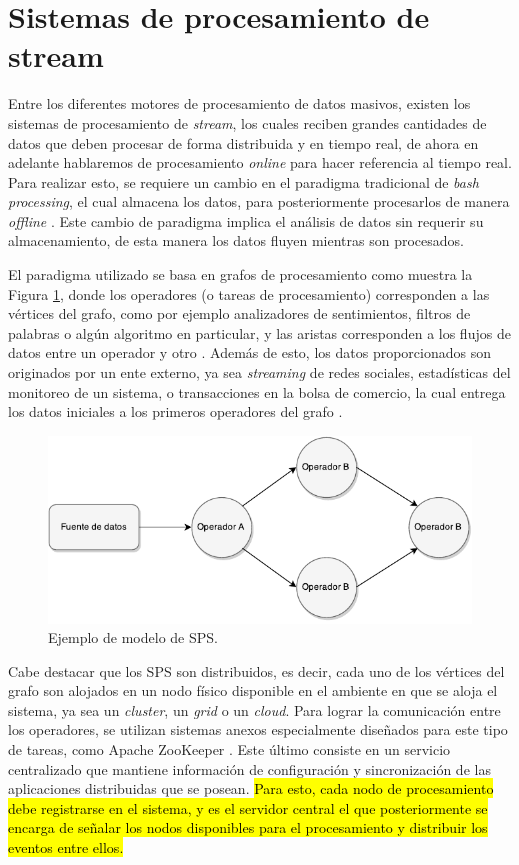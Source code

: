\section{Sistemas de procesamiento de stream}
\label{sec:SPS}

Entre los diferentes motores de procesamiento de datos masivos, existen los sistemas de procesamiento de \textsl{stream}, los cuales reciben grandes cantidades de datos que deben procesar de forma distribuida y en tiempo real, de ahora en adelante hablaremos de procesamiento \textsl{online} para hacer referencia al tiempo real. Para realizar esto, se requiere un cambio en el paradigma tradicional de \textsl{bash processing}, el cual almacena los datos, para posteriormente procesarlos de manera \textit{offline} \citep{HawwashN14}. Este cambio de paradigma implica el análisis de datos sin requerir su almacenamiento, de esta manera los datos fluyen mientras son procesados.

El paradigma utilizado se basa en grafos de procesamiento como muestra la Figura \ref{fig:grafo}, donde los operadores (o tareas de procesamiento) corresponden a las vértices del grafo, como por ejemplo analizadores de sentimientos, filtros de palabras o algún algoritmo en particular, y las aristas corresponden a los flujos de datos entre un operador y otro \citep{Shahrivari14}. Además de esto, los datos proporcionados son originados por un ente externo, ya sea \textit{streaming} de redes sociales, estadísticas del monitoreo de un sistema, o transacciones en la bolsa de comercio, la cual entrega los datos iniciales a los primeros operadores del grafo \citep{AppelFFB12}.

\begin{figure}[ht!]
  \centering
    \includegraphics[scale=1]{images/SPS.pdf}
  \caption{Ejemplo de modelo de SPS.}
  \label{fig:grafo}
\end{figure}

Cabe destacar que los SPS son distribuidos, es decir, cada uno de los vértices del grafo son alojados en un nodo físico disponible en el ambiente en que se aloja el sistema, ya sea un \textit{cluster}, un \textit{grid} o un \textit{cloud}. Para lograr la comunicación entre los operadores, se utilizan sistemas anexos especialmente diseñados para este tipo de tareas, como Apache ZooKeeper \citep{HuntKJR10}. Este último consiste en un servicio centralizado que mantiene información de configuración y sincronización de las aplicaciones distribuidas que se posean. \hl{Para esto, cada nodo de procesamiento debe registrarse en el sistema, y es el servidor central el que posteriormente se encarga de señalar los nodos disponibles para el procesamiento y distribuir los eventos entre ellos.}

